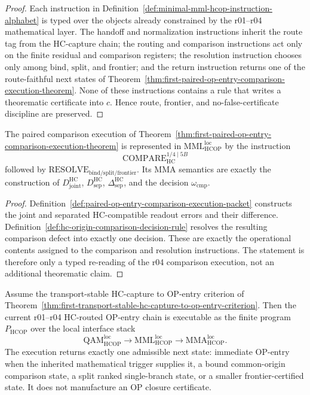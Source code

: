 \begin{proof}
Each instruction in Definition~\ref{def:minimal-mml-hcop-instruction-alphabet} is typed over the objects already constrained by the r01--r04 mathematical layer. The handoff and normalization instructions inherit the route tag from the HC-capture chain; the routing and comparison instructions act only on the finite residual and comparison registers; the resolution instruction chooses only among \(\mathrm{bind}\), \(\mathrm{split}\), and \(\mathrm{frontier}\); and the return instruction returns one of the route-faithful next states of Theorem~\ref{thm:first-paired-op-entry-comparison-execution-theorem}. None of these instructions contains a rule that writes a theorematic certificate into \(c\). Hence route, frontier, and no-false-certificate discipline are preserved.
\end{proof}

\begin{proposition}
\label{prop:r04-comparison-as-one-admissible-mml-mma-step}
The paired comparison execution of Theorem~\ref{thm:first-paired-op-entry-comparison-execution-theorem} is represented in \(\mathrm{MML}_{\mathrm{HCOP}}^{\mathrm{loc}}\) by the instruction
\[
  \mathrm{COMPARE}_{\mathrm{HC}}^{1/4\mid 5B}
\]
followed by \(\mathrm{RESOLVE}_{\mathrm{bind/split/frontier}}\). Its MMA semantics are exactly the construction of \(D_{\mathrm{joint}}^{\mathrm{HC}}\), \(D_{\mathrm{sep}}^{\mathrm{HC}}\), \(\Delta_{\mathrm{sep}}^{\mathrm{HC}}\), and the decision \(\omega_{\mathrm{cmp}}\).
\end{proposition}

\begin{proof}
Definition~\ref{def:paired-op-entry-comparison-execution-packet} constructs the joint and separated HC-compatible readout errors and their difference. Definition~\ref{def:hc-origin-comparison-decision-rule} resolves the resulting comparison defect into exactly one decision. These are exactly the operational contents assigned to the comparison and resolution instructions. The statement is therefore only a typed re-reading of the r04 comparison execution, not an additional theorematic claim.
\end{proof}

\begin{theorem}
\label{thm:hc-routed-op-entry-as-finite-mml-mma-program}
Assume the transport-stable HC-capture to OP-entry criterion of Theorem~\ref{thm:first-transport-stable-hc-capture-to-op-entry-criterion}. Then the current r01--r04 HC-routed OP-entry chain is executable as the finite program \(P_{\mathrm{HCOP}}\) over the local interface stack
\[
  \mathrm{QAM}_{\mathrm{HCOP}}^{\mathrm{loc}}
  \longrightarrow
  \mathrm{MML}_{\mathrm{HCOP}}^{\mathrm{loc}}
  \longrightarrow
  \mathrm{MMA}_{\mathrm{HCOP}}^{\mathrm{loc}}.
\]
The execution returns exactly one admissible next state: immediate OP-entry when the inherited mathematical trigger supplies it, a bound common-origin comparison state, a split ranked single-branch state, or a smaller frontier-certified state. It does not manufacture an OP closure certificate.
\end{theorem}

